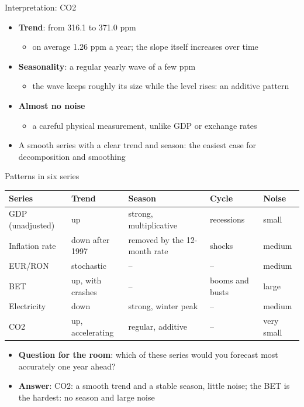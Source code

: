 \begin{frame}{Interpretation: CO2}
\itemsize{\small}
\begin{itemize}
    \item \textbf{Trend}: from 316.1 to 371.0 ppm
    \begin{itemize}
        \item on average 1.26 ppm a year; the slope itself increases over time
    \end{itemize}
    \item \textbf{Seasonality}: a regular yearly wave of a few ppm
    \begin{itemize}
        \item the wave keeps roughly its size while the level rises: an additive pattern
    \end{itemize}
    \item \textbf{Almost no noise}
    \begin{itemize}
        \item a careful physical measurement, unlike GDP or exchange rates
    \end{itemize}
    \item A smooth series with a clear trend and season: the easiest case for decomposition and smoothing
\end{itemize}
\end{frame}

\begin{frame}{Patterns in six series}
\itemsize{\footnotesize}
\begin{center}
\scriptsize
\begin{tabular}{lllll}
\toprule
\textbf{Series} & \textbf{Trend} & \textbf{Season} & \textbf{Cycle} & \textbf{Noise} \\
\midrule
GDP (unadjusted) & up & strong, multiplicative & recessions & small \\
Inflation rate & down after 1997 & removed by the 12-month rate & shocks & medium \\
EUR/RON & stochastic & -- & -- & medium \\
BET & up, with crashes & -- & booms and busts & large \\
Electricity & down & strong, winter peak & -- & medium \\
CO2 & up, accelerating & regular, additive & -- & very small \\
\bottomrule
\end{tabular}
\end{center}
\begin{itemize}
    \item \textbf{Question for the room}: which of these series would you forecast most accurately one year ahead?
    \pause
    \item \textbf{Answer}: CO2: a smooth trend and a stable season, little noise; the BET is the hardest: no season and large noise
\end{itemize}
\end{frame}



